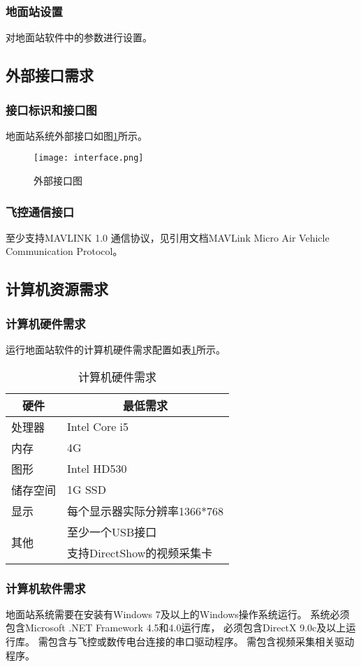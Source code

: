 \subsubsection{地面站设置}
对地面站软件中的参数进行设置。

\subsection{外部接口需求}

\subsubsection{接口标识和接口图}
地面站系统外部接口如图\ref{f3int}所示。
\begin{figure}[ht]
	\begin{center}
		\texttt{[image: interface.png]}
		\caption{外部接口图}
		\label{f3int}
	\end{center}
\end{figure}

\subsubsection{飞控通信接口}
至少支持MAVLINK 1.0 通信协议，见引用文档MAVLink Micro Air Vehicle Communication Protocol。


\subsection{计算机资源需求}
\subsubsection{计算机硬件需求}
运行地面站软件的计算机硬件需求配置如表\ref{t3req}所示。
\begin{table}[ht]
\centering
\caption{计算机硬件需求}
\label{t3req}
\begin{tabular}{|l|l|}
\hline
\multicolumn{1}{|c|}{硬件} & \multicolumn{1}{c|}{最低需求} \\ \hline
处理器                      & Intel Core i5             \\ \hline
内存                       & 4G                        \\ \hline
图形                       & Intel HD530               \\ \hline
储存空间                     & 1G SSD                    \\ \hline
显示                       & 每个显示器实际分辨率1366*768        \\ \hline
\multirow{2}{*}{其他}      & 至少一个USB接口                 \\ \cline{2-2} 
                         & 支持DirectShow的视频采集卡        \\ \hline
\end{tabular}
\end{table}


\subsubsection{计算机软件需求}
地面站系统需要在安装有Windows 7及以上的Windows操作系统运行。
系统必须包含Microsoft .NET Framework 4.5和4.0运行库，
必须包含DirectX 9.0c及以上运行库。
需包含与飞控或数传电台连接的串口驱动程序。
需包含视频采集相关驱动程序。
\endinput